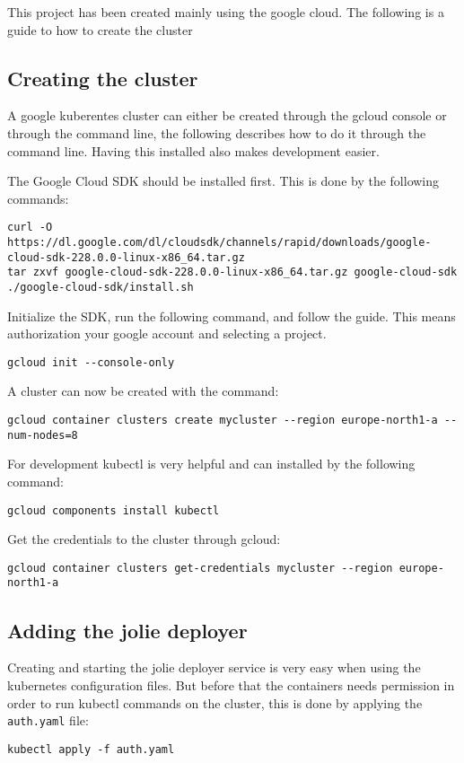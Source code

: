 \documentclass[Report.tex]{subfiles}
\begin{document}

This project has been created mainly using the google cloud. The following is a guide to how to create the cluster



\subsection{Creating the cluster}
A google kuberentes cluster can either be created through the gcloud console or through the command line, the following describes how to do it through the command line. Having this installed also makes development easier.

The Google Cloud SDK should be installed first. This is done by the following commands:
\begin{lstlisting}[style=terminal]
curl -O https://dl.google.com/dl/cloudsdk/channels/rapid/downloads/google-cloud-sdk-228.0.0-linux-x86_64.tar.gz
tar zxvf google-cloud-sdk-228.0.0-linux-x86_64.tar.gz google-cloud-sdk
./google-cloud-sdk/install.sh
\end{lstlisting}

Initialize the SDK, run the following command, and follow the guide. This means authorization your google account and selecting a project.
\begin{lstlisting}[style=terminal]
gcloud init --console-only
\end{lstlisting}

A cluster can now be created with the command:
\begin{lstlisting}[style=terminal]
gcloud container clusters create mycluster --region europe-north1-a --num-nodes=8
\end{lstlisting}

For development kubectl is very helpful and can installed by the following command:
\begin{lstlisting}[style=terminal]
gcloud components install kubectl
\end{lstlisting}

Get the credentials to the cluster through gcloud:
\begin{lstlisting}[style=terminal]
gcloud container clusters get-credentials mycluster --region europe-north1-a
\end{lstlisting}


\subsection{Adding the jolie deployer}
Creating and starting the jolie deployer service is very easy when using the kubernetes configuration files. But before that the containers needs permission in order to run kubectl commands on the cluster, this is done by applying the \texttt{auth.yaml} file:
\begin{lstlisting}[style=terminal]
kubectl apply -f auth.yaml
\end{lstlisting}
\end{document}

